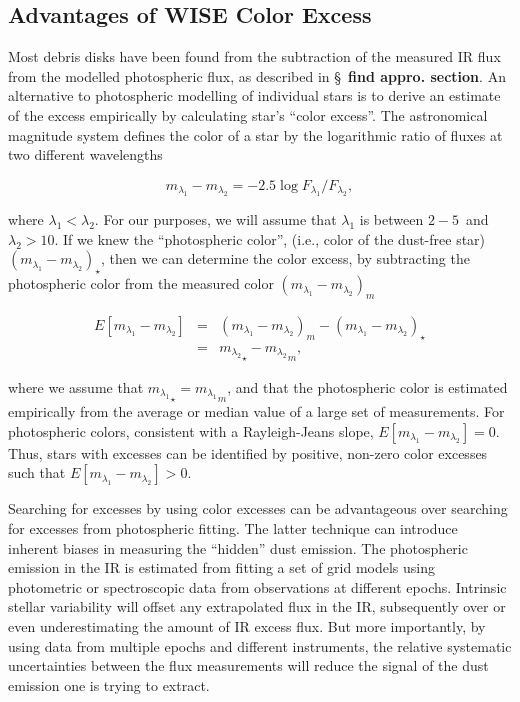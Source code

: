     \subsection{Advantages of WISE Color Excess}
    
    Most debris disks have been found from the subtraction of the measured IR flux from the modelled photospheric flux, as described in \S~\textbf{find appro. section}. An alternative to photospheric modelling of individual stars is to derive an estimate of the excess empirically by calculating star's ``color excess''. The astronomical magnitude system defines the color of a star by the logarithmic ratio of fluxes at two different wavelengths
    
    \begin{equation}\label{eq:color}
    m_{\lambda_1} - m_{\lambda_2} = -2.5\log{F_{\lambda_1}/F_{\lambda_2}},
    \end{equation}
    
    \noindent where $\lambda_1<\lambda_2$. For our purposes, we will assume that $\lambda_1$ is between $2-5$\micron\ and $\lambda_2>10$\micron. If we knew the ``photospheric color'', (i.e., color of the dust-free star) ${\left(m_{\lambda_1} - m_{\lambda_2}\right)}_\star$, then we can determine the color excess, by subtracting the photospheric color from the measured color ${\left(m_{\lambda_1} - m_{\lambda_2}\right)}_m$
    
    \begin{eqnarray}\label{eq:color_excess}
    E\left[m_{\lambda_1} - m_{\lambda_2}\right] &=& {\left(m_{\lambda_1} - m_{\lambda_2}\right)}_m - {\left(m_{\lambda_1} - m_{\lambda_2}\right)}_\star \\ 
    &=& {m_{\lambda_2}}_\star - {m_{\lambda_2}}_m,
    \end{eqnarray}
    
    \noindent where we assume that ${m_{\lambda_1}}_\star = {m_{\lambda_1}}_m$, and that the photospheric color is estimated empirically from the average or median value of a large set of measurements. For photospheric colors, consistent with a Rayleigh-Jeans slope, $E\left[m_{\lambda_1} - m_{\lambda_2}\right]=0$. Thus, stars with excesses can be identified by positive, non-zero color excesses such that $E\left[m_{\lambda_1} - m_{\lambda_2}\right]>0$. 
    
    
    Searching for excesses by using color excesses can be advantageous over searching for excesses from photospheric fitting. The latter technique can introduce inherent biases in measuring the ``hidden'' dust emission. The photospheric emission in the IR is estimated from fitting a set of grid models using photometric or spectroscopic data from observations at different epochs. Intrinsic stellar variability will offset any extrapolated flux in the IR, subsequently over or even underestimating the amount of IR excess flux. But more importantly, by using data from multiple epochs and different instruments, the relative systematic uncertainties between the flux measurements will reduce the signal of the dust emission one is trying to extract.
    
